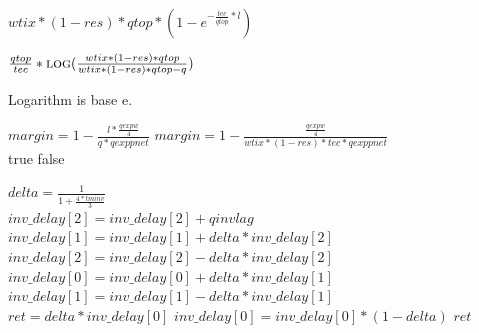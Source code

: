\documentclass{article}
\begin{document}
\begin{algorithm}[H]
\caption{Qfr}
    \begin{algorithmic}
        \State \Return $wtix * (1 - res) * qtop * (1 - e^{-\frac{tec}{qtop} * l})$
        \EndFunction
    \end{algorithmic}
\end{algorithm}

\begin{algorithm}[!htbp]
\caption{Rfq}
    \begin{algorithmic}
        \State \Return $\frac{qtop}{tec} * \Call{log}{\frac{wtix * (1 - res) * qtop}{wtix * (1 - res) * qtop - q}}$
        \EndFunction
    \end{algorithmic}
    \small Logarithm is base e.
\end{algorithm}

\begin{algorithm}[!htbp]
\caption{Sat}
    \begin{algorithmic}
        \State $margin = 1 - \frac{l * \frac{qexpw}{4}}{q * qexppnet}$
        \Else
        \State $margin = 1 - \frac{\frac{qexpw}{4}}{wtix * (1 - res) * tec * qexppnet}$
        \EndIf
        \\
        \State \Return true
        \Else
        \State \Return false
        \EndIf
        \EndFunction
    \end{algorithmic}
\end{algorithm}

\begin{algorithm}[!htbp]
\caption{Delay}
    \begin{algorithmic}
        \State \(delta = \frac{1}{1 + \frac{4 * tminv}{3}}\)
        \\
        \State \(inv\_delay\left[2\right] = inv\_delay\left[2\right] + qinvlag\)
        \State \(inv\_delay\left[1\right] = inv\_delay\left[1\right] + delta * inv\_delay\left[2\right]\)
        \State \(inv\_delay\left[2\right] = inv\_delay\left[2\right] - delta * inv\_delay\left[2\right]\)
        \State \(inv\_delay\left[0\right] = inv\_delay\left[0\right] + delta * inv\_delay\left[1\right]\)
        \State \(inv\_delay\left[1\right] = inv\_delay\left[1\right] - delta * inv\_delay\left[1\right]\)
        \\
        \State \(ret = delta * inv\_delay\left[0\right]\)
        \State \(inv\_delay\left[0\right] = inv\_delay\left[0\right] * (1 - delta)\)
        \State \Return \(ret\)
        \EndFunction
    \end{algorithmic}
\end{algorithm}
\end{document}
